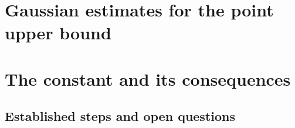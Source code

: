 \documentclass[12pt,oneside,openany]{book}
\numberwithin{equation}{section}
\theoremstyle{nogostyle}
\theoremstyle{definition}
\begin{document}








\chapter{Gaussian estimates for the point upper bound}\label{S:book-point-upper}









\chapter{The constant and its consequences}\label{S:book-constant}








\section{Established steps and open questions}\label{S:route}
\end{document}
